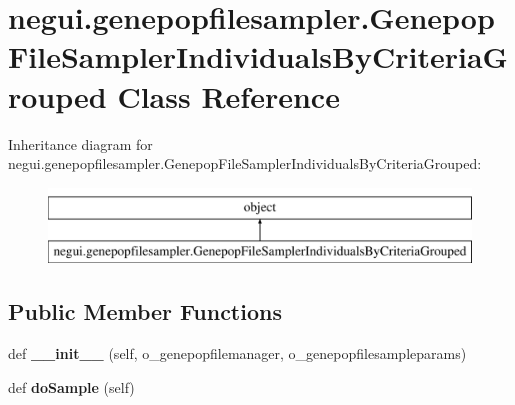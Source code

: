\hypertarget{classnegui_1_1genepopfilesampler_1_1GenepopFileSamplerIndividualsByCriteriaGrouped}{}\section{negui.\+genepopfilesampler.\+Genepop\+File\+Sampler\+Individuals\+By\+Criteria\+Grouped Class Reference}
\label{classnegui_1_1genepopfilesampler_1_1GenepopFileSamplerIndividualsByCriteriaGrouped}
Inheritance diagram for negui.\+genepopfilesampler.\+Genepop\+File\+Sampler\+Individuals\+By\+Criteria\+Grouped\+:\begin{figure}[H]
\begin{center}
\leavevmode
\includegraphics[height=2.000000cm]{classnegui_1_1genepopfilesampler_1_1GenepopFileSamplerIndividualsByCriteriaGrouped}
\end{center}
\end{figure}
\subsection*{Public Member Functions}
\begin{DoxyCompactItemize}
\item 
def {\bfseries \+\_\+\+\_\+init\+\_\+\+\_\+} (self, o\+\_\+genepopfilemanager, o\+\_\+genepopfilesampleparams)\hypertarget{classnegui_1_1genepopfilesampler_1_1GenepopFileSamplerIndividualsByCriteriaGrouped_a47bba07ea5592ffbda7ef58c78e194e2}{}\label{classnegui_1_1genepopfilesampler_1_1GenepopFileSamplerIndividualsByCriteriaGrouped_a47bba07ea5592ffbda7ef58c78e194e2}

\item 
def {\bfseries do\+Sample} (self)\hypertarget{classnegui_1_1genepopfilesampler_1_1GenepopFileSamplerIndividualsByCriteriaGrouped_a6bdd6f8fd7d56c41f14cf9744e862766}{}\label{classnegui_1_1genepopfilesampler_1_1GenepopFileSamplerIndividualsByCriteriaGrouped_a6bdd6f8fd7d56c41f14cf9744e862766}

\end{DoxyCompactItemize}


